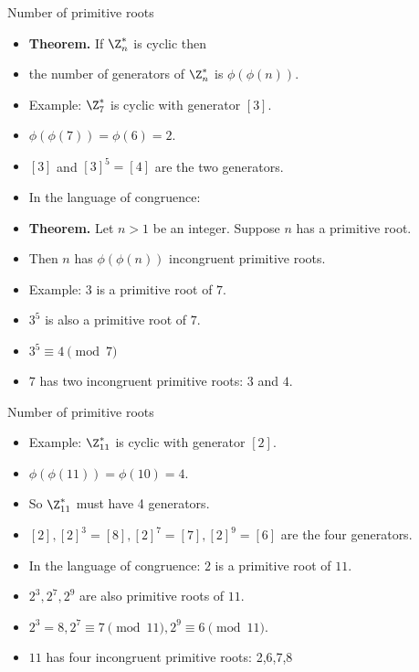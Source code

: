 \documentclass{beamer}
\begin{document}
\begin{frame}{Number of primitive roots}

\begin{itemize}
  \item \textbf{Theorem.} If $\Z_n^*$ is cyclic then
  \item the number of generators of $\Z_n^*$ is $\phi(\phi(n))$.
  \item Example: $\Z_7^*$ is cyclic with generator $[3]$.
  \item $\phi(\phi(7)) = \phi(6) = 2$.
  \item $[3]$ and $[3]^5 = [4]$ are the two generators.
  \item In the language of congruence:
  \item \textbf{Theorem.} Let $n>1$ be an integer. Suppose $n$ has a primitive root.
  \item Then $n$ has $\phi(\phi(n))$ incongruent primitive roots.
  \item Example: $3$ is a primitive root of $7$.
  \item $3^5$ is also a primitive root of $7$.
  \item $3^5 \equiv 4 \pmod 7$
  \item $7$ has two incongruent primitive roots: $3$ and $4$.
\end{itemize}

\end{frame}

\begin{frame}{Number of primitive roots}

\begin{itemize}
  \item Example: $\Z_{11}^*$ is cyclic with generator $[2]$.
  \item $\phi(\phi(11)) = \phi(10) = 4$.
  \item So $\Z_{11}^*$ must have 4 generators.
  \item $[2],[2]^3=[8], [2]^7=[7], [2]^9 = [6]$ are the four generators.
  \item In the language of congruence: $2$ is a primitive root of $11$.
  \item $2^3,2^7,2^9$ are also primitive roots of $11$.
  \item $2^3 = 8, 2^7 \equiv 7 \pmod{11}, 2^9 \equiv 6 \pmod {11}$.
  \item $11$ has four incongruent primitive roots: 2,6,7,8
\end{itemize}

\end{frame}
\end{document}

